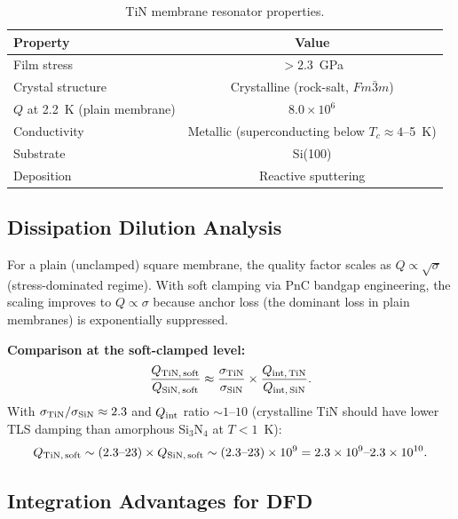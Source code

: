 \documentclass[11pt]{article}
\theoremstyle{definition}
\theoremstyle{remark}
\newcommand{\ee}[1]{\times 10^{#1}}
\begin{document}
\begin{table}[H]
\centering
\caption{TiN membrane resonator properties.}
\renewcommand{\arraystretch}{1.3}
\begin{tabular}{lc}
\toprule
\textbf{Property} & \textbf{Value} \\
\midrule
Film stress & $> 2.3$~GPa \\
Crystal structure & Crystalline (rock-salt, $Fm\bar{3}m$) \\
$Q$ at 2.2~K (plain membrane) & $8.0\ee{6}$ \\
Conductivity & Metallic (superconducting below $T_c \approx 4$--5~K) \\
Substrate & Si(100) \\
Deposition & Reactive sputtering \\
\bottomrule
\end{tabular}
\end{table}

\subsection{Dissipation Dilution Analysis}

For a plain (unclamped) square membrane, the quality factor scales
as $Q \propto \sqrt{\sigma}$ (stress-dominated regime). With soft
clamping via PnC bandgap engineering, the scaling improves to
$Q \propto \sigma$ because anchor loss (the dominant loss in plain
membranes) is exponentially suppressed.

\textbf{Comparison at the soft-clamped level:}
\begin{equation}
\frac{Q_{\rm TiN,\,soft}}{Q_{\rm SiN,\,soft}} \approx
\frac{\sigma_{\rm TiN}}{\sigma_{\rm SiN}} \times
\frac{Q_{\rm int,\,TiN}}{Q_{\rm int,\,SiN}}.
\end{equation}
With $\sigma_{\rm TiN}/\sigma_{\rm SiN} \approx 2.3$ and
$Q_{\rm int}$ ratio $\sim 1$--$10$ (crystalline TiN should have
lower TLS damping than amorphous Si$_3$N$_4$ at $T < 1$~K):
\begin{equation}
Q_{\rm TiN,\,soft} \sim (2.3\text{--}23) \times Q_{\rm SiN,\,soft}
\sim (2.3\text{--}23) \times 10^9 = 2.3\ee{9}\text{--}2.3\ee{10}.
\end{equation}

\subsection{Integration Advantages for DFD}
\end{document}

